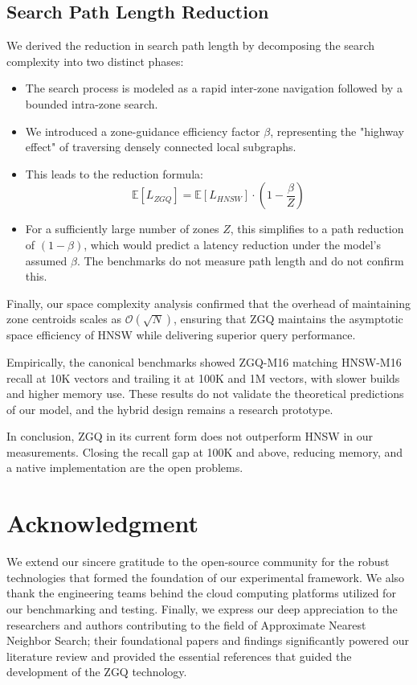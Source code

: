 \documentclass[conference]{IEEEtran}
\begin{document}
\subsection*{Search Path Length Reduction}
We derived the reduction in search path length by decomposing the search complexity into two distinct phases:
\begin{itemize}
    \item The search process is modeled as a rapid inter-zone navigation followed by a bounded intra-zone search.
    \item We introduced a zone-guidance efficiency factor $\beta$, representing the "highway effect" of traversing densely connected local subgraphs.
    \item This leads to the reduction formula:
    \begin{equation}
    \mathbb{E}[L_{ZGQ}] = \mathbb{E}[L_{HNSW}] \cdot \left(1 - \frac{\beta}{Z}\right)
    \end{equation}
    \item For a sufficiently large number of zones $Z$, this simplifies to a path reduction of $(1 - \beta)$, which would predict a latency reduction under the model's assumed $\beta$. The benchmarks do not measure path length and do not confirm this.
\end{itemize}

Finally, our space complexity analysis confirmed that the overhead of maintaining zone centroids scales as $\mathcal{O}(\sqrt{N})$, ensuring that ZGQ maintains the asymptotic space efficiency of HNSW while delivering superior query performance.

Empirically, the canonical benchmarks showed ZGQ-M16 matching HNSW-M16 recall at 10K vectors and trailing it at 100K and 1M vectors, with slower builds and higher memory use. These results do not validate the theoretical predictions of our model, and the hybrid design remains a research prototype.

In conclusion, ZGQ in its current form does not outperform HNSW in our measurements. Closing the recall gap at 100K and above, reducing memory, and a native implementation are the open problems.

\section*{Acknowledgment}
We extend our sincere gratitude to the open-source community for the robust technologies that formed the foundation of our experimental framework. We also thank the engineering teams behind the cloud computing platforms utilized for our benchmarking and testing. Finally, we express our deep appreciation to the researchers and authors contributing to the field of Approximate Nearest Neighbor Search; their foundational papers and findings significantly powered our literature review and provided the essential references that guided the development of the ZGQ technology.
\end{document}
